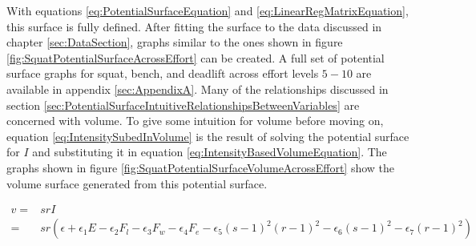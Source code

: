 With equations \ref{eq:PotentialSurfaceEquation} and \ref{eq:LinearRegMatrixEquation}, this surface is fully defined. After fitting the surface to the data discussed in chapter \ref{sec:DataSection}, graphs similar to the ones shown in figure \ref{fig:SquatPotentialSurfaceAcrossEffort} can be created. A full set of potential surface graphs for squat, bench, and deadlift across effort levels $5-10$ are available in appendix \ref{sec:AppendixA}. Many of the relationships discussed in section \ref{sec:PotentialSurfaceIntuitiveRelationshipsBetweenVariables} are concerned with volume. To give some intuition for volume before moving on, equation \ref{eq:IntensitySubedInVolume} is the result of solving the potential surface for $I$ and substituting it in equation \ref{eq:IntensityBasedVolumeEquation}. The graphs shown in figure \ref{fig:SquatPotentialSurfaceVolumeAcrossEffort} show the volume surface generated from this potential surface.

\begin{equation}
    \label{eq:IntensitySubedInVolume}
    \begin{split}
    		v = & srI \\
    			= & sr \left( 
    			\epsilon+
    			\epsilon_1 E-
    			\epsilon_2 F_l-
    			\epsilon_3 F_w-
    			\epsilon_4 F_e-
    			\epsilon_5(s-1)^2(r-1)^2-
    			\epsilon_6(s-1)^2-
    			\epsilon_7(r-1)^2
    		\right)
    \end{split}
\end{equation}

